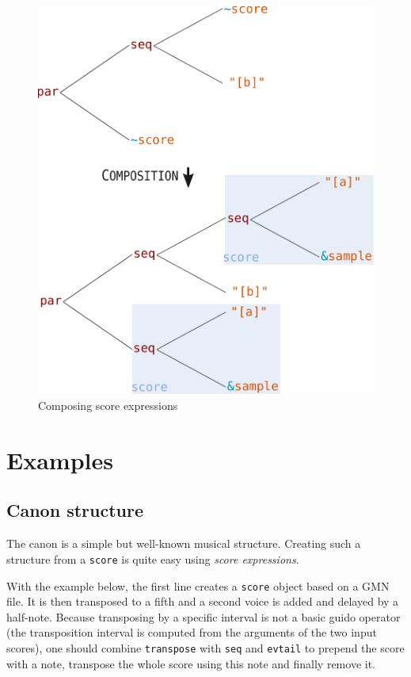 \documentclass{article}
\newcommand{\OSC}[1]{{\fontsize{9.5pt}{10pt} \selectfont\texttt{#1}}}
\newcommand{\sExpr}{\emph{score expressions}}
\begin{document}
{\begin{figure}[th]
\centering
\includegraphics[width=0.9\columnwidth]{imgs/expandingTree}
\caption{Composing score expressions
\label{fig:expandingTree}}
\end{figure}

\section{Examples}
\label{examples}

\subsection{Canon structure}

The canon is a simple but well-known musical structure. Creating such a structure from a \OSC{score} is quite easy using \sExpr.

With the example below, the first line creates a \OSC{score} object based on a GMN file. It is then transposed to a fifth and a second voice is added and delayed by a half-note. Because transposing by a specific interval is not a basic guido operator (the transposition interval is computed from the arguments of the two input scores), one should combine \OSC{transpose} with \OSC{seq} and \OSC{evtail} to prepend the score with a note, transpose the whole score using this note and finally remove it.

}
\end{document}
